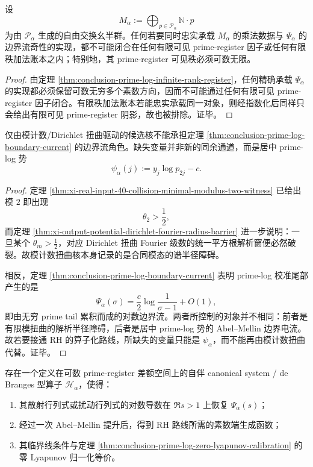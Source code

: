\begin{corollary}\label{cor:conclusion-prime-log-faithful-layer-countable-infinite-rank}
设
\[
M_\alpha:=\bigoplus_{p\in \mathcal P_\alpha}\mathbb N\cdot p
\]
为由 \(\mathcal P_\alpha\) 生成的自由交换幺半群。任何若要同时忠实承载 \(M_\alpha\) 的乘法数据与 \(\Psi_\alpha\) 的边界流奇性的实现，都不可能闭合在任何有限可见 prime-register 因子或任何有限秩加法账本之内；特别地，其 prime-register 可见秩必须可数无限。
\end{corollary}
\begin{proof}
由定理 \ref{thm:conclusion-prime-log-infinite-rank-register}，任何精确承载 \(\Psi_\alpha\) 的实现都必须保留可数无穷多个素数方向，因而不可能通过任何有限可见 prime-register 因子闭合。有限秩加法账本若能忠实承载同一对象，则经指数化后同样只会给出有限可见 prime-register 阴影，故也被排除。证毕。
\end{proof}

\begin{corollary}\label{cor:conclusion-prime-log-modular-twist-insufficient}
仅由模计数/Dirichlet 扭曲驱动的候选核不能承担定理 \ref{thm:conclusion-prime-log-boundary-current} 的边界流角色。缺失变量并非新的同余通道，而是居中 prime-log 势
\[
\psi_\alpha(j):=y_j\log p_{2j}-c.
\]
\end{corollary}
\begin{proof}
定理 \ref{thm:xi-real-input-40-collision-minimal-modulus-two-witness} 已给出模 \(2\) 即出现
\[
\theta_2>\frac12,
\]
而定理 \ref{thm:xi-output-potential-dirichlet-fourier-radius-barrier} 进一步说明：一旦某个 \(\theta_m>\frac12\)，对应 Dirichlet 扭曲 Fourier 级数的统一平方根解析窗便必然破裂。故模计数扭曲核本身记录的是合同模态的谱半径障碍。

相反，定理 \ref{thm:conclusion-prime-log-boundary-current} 表明 prime-log 校准尾部产生的是
\[
\Psi_\alpha(\sigma)=\frac{c}{2}\log\frac{1}{\sigma-1}+O(1),
\]
即由无穷 prime tail 累积而成的对数边界流。两者所控制的对象并不相同：前者是有限模扭曲的解析半径障碍，后者是居中 prime-log 势的 Abel--Mellin 边界电流。故若要接通 RH 的算子化路线，所缺失的变量只能是 \(\psi_\alpha\)，而不能再由模计数扭曲代替。证毕。
\end{proof}

\begin{conjecture}\label{conj:conclusion-prime-log-canonical-system}
存在一个定义在可数 prime-register 差额空间上的自伴 canonical system / de Branges 型算子 \(\mathcal H_\alpha\)，使得：
\begin{enumerate}
  \item 其散射行列式或扰动行列式的对数导数在 \(\Re s>1\) 上恢复 \(\Psi_\alpha(s)\)；
  \item 经过一次 Abel--Mellin 提升后，得到 RH 路线所需的素数端生成函数；
  \item 其临界线条件与定理 \ref{thm:conclusion-prime-log-zero-lyapunov-calibration} 的零 Lyapunov 归一化等价。
\end{enumerate}
\end{conjecture}

